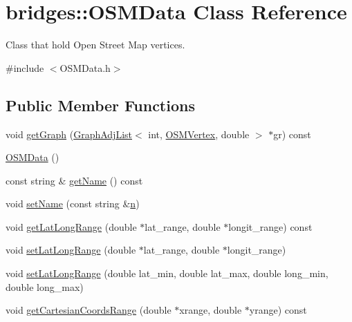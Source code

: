 \hypertarget{classbridges_1_1_o_s_m_data}{}\section{bridges\+::O\+S\+M\+Data Class Reference}
\label{classbridges_1_1_o_s_m_data}


Class that hold Open Street Map vertices.  




{\ttfamily \#include $<$O\+S\+M\+Data.\+h$>$}

\subsection*{Public Member Functions}
\begin{DoxyCompactItemize}
\item 
void \mbox{\hyperlink{classbridges_1_1_o_s_m_data_a3f4f59ddcfb8d01e737106a3e48a1b52}{get\+Graph}} (\mbox{\hyperlink{classbridges_1_1_graph_adj_list}{Graph\+Adj\+List}}$<$ int, \mbox{\hyperlink{classbridges_1_1_o_s_m_vertex}{O\+S\+M\+Vertex}}, double $>$ $\ast$gr) const
\item 
\mbox{\hyperlink{classbridges_1_1_o_s_m_data_a8abc19a052659621f74d7cbe354f90e9}{O\+S\+M\+Data}} ()
\item 
const string \& \mbox{\hyperlink{classbridges_1_1_o_s_m_data_a420a29bced0d8c04bc5afcb9adf0621a}{get\+Name}} () const
\item 
void \mbox{\hyperlink{classbridges_1_1_o_s_m_data_afd9750f005c1cee41f54b93de3a9c241}{set\+Name}} (const string \&\mbox{\hyperlink{namespacebridges_acfb0a4f7877d8f63de3e6862004c50eda7b8b965ad4bca0e41ab51de7b31363a1}{n}})
\item 
void \mbox{\hyperlink{classbridges_1_1_o_s_m_data_ad342159a5b7647238fda36ae91d0836e}{get\+Lat\+Long\+Range}} (double $\ast$lat\+\_\+range, double $\ast$longit\+\_\+range) const
\item 
void \mbox{\hyperlink{classbridges_1_1_o_s_m_data_a75197b6c3de0ada8c69aae3051368d00}{set\+Lat\+Long\+Range}} (double $\ast$lat\+\_\+range, double $\ast$longit\+\_\+range)
\item 
void \mbox{\hyperlink{classbridges_1_1_o_s_m_data_a4ddb01d0735da5e21fd8e33d1d5203ad}{set\+Lat\+Long\+Range}} (double lat\+\_\+min, double lat\+\_\+max, double long\+\_\+min, double long\+\_\+max)
\item 
void \mbox{\hyperlink{classbridges_1_1_o_s_m_data_ade3af326972e31ce991798e800fbbd5b}{get\+Cartesian\+Coords\+Range}} (double $\ast$xrange, double $\ast$yrange) const

\end{DoxyCompactItemize}
